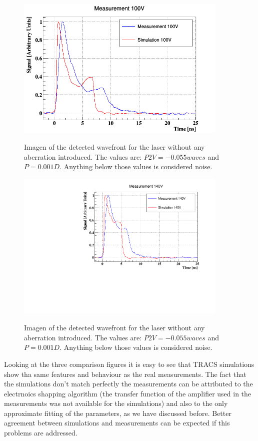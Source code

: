 \begin{figure}[H]
	\centering
	\includegraphics[width=0.9\textwidth]{100V.png}
	\label{fig:mues2}
	\caption{Imagen of the detected wavefront for the laser without any aberration introduced. The values are: $P2V = -0.055waves$ and $P = 0.001D$. Anything below those values is considered noise.}
\end{figure}

\begin{figure}[H]
	\centering
	\includegraphics[width=0.9\textwidth]{140V.png}
	\label{fig:mues2}
	\caption{Imagen of the detected wavefront for the laser without any aberration introduced. The values are: $P2V = -0.055waves$ and $P = 0.001D$. Anything below those values is considered noise.}
\end{figure}

Looking at the three comparison figures it is easy to see that TRACS simulations show tha same features and behaviour as the real measurements. The fact that the simulations don't match perfectly the measurements can be attributed to the electrnoics shapping algorithm (the transfer function of the amplifier used in the measurements was not available for the simulations) and also to the only approximate fitting of the parameters, as we have discussed before. Better agreement between simulations and measurements can be expected if this problems are addressed.

